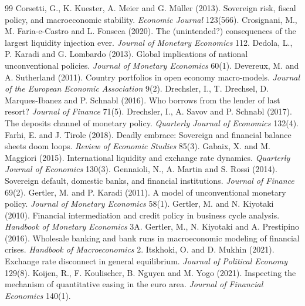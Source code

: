 \documentclass[11pt]{article}
\begin{document}
\begin{thebibliography}{99}
 Corsetti, G., K. Kuester, A. Meier and G. M\"uller (2013). Sovereign risk, fiscal policy, and macroeconomic stability. \emph{Economic Journal} 123(566).
 Crosignani, M., M. Faria-e-Castro and L. Fonseca (2020). The (unintended?) consequences of the largest liquidity injection ever. \emph{Journal of Monetary Economics} 112.
 Dedola, L., P. Karadi and G. Lombardo (2013). Global implications of national unconventional policies. \emph{Journal of Monetary Economics} 60(1).
 Devereux, M. and A. Sutherland (2011). Country portfolios in open economy macro-models. \emph{Journal of the European Economic Association} 9(2).
 Drechsler, I., T. Drechsel, D. Marques-Ibanez and P. Schnabl (2016). Who borrows from the lender of last resort? \emph{Journal of Finance} 71(5).
 Drechsler, I., A. Savov and P. Schnabl (2017). The deposits channel of monetary policy. \emph{Quarterly Journal of Economics} 132(4).
 Farhi, E. and J. Tirole (2018). Deadly embrace: Sovereign and financial balance sheets doom loops. \emph{Review of Economic Studies} 85(3).
 Gabaix, X. and M. Maggiori (2015). International liquidity and exchange rate dynamics. \emph{Quarterly Journal of Economics} 130(3).
 Gennaioli, N., A. Martin and S. Rossi (2014). Sovereign default, domestic banks, and financial institutions. \emph{Journal of Finance} 69(2).
 Gertler, M. and P. Karadi (2011). A model of unconventional monetary policy. \emph{Journal of Monetary Economics} 58(1).
 Gertler, M. and N. Kiyotaki (2010). Financial intermediation and credit policy in business cycle analysis. \emph{Handbook of Monetary Economics} 3A.
 Gertler, M., N. Kiyotaki and A. Prestipino (2016). Wholesale banking and bank runs in macroeconomic modeling of financial crises. \emph{Handbook of Macroeconomics} 2.
 Itskhoki, O. and D. Mukhin (2021). Exchange rate disconnect in general equilibrium. \emph{Journal of Political Economy} 129(8).
 Koijen, R., F. Koulischer, B. Nguyen and M. Yogo (2021). Inspecting the mechanism of quantitative easing in the euro area. \emph{Journal of Financial Economics} 140(1).

\end{thebibliography}
\end{document}
